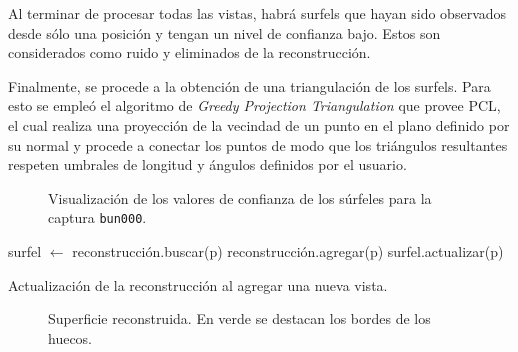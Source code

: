 	Al terminar de procesar todas las vistas, habrá surfels que hayan sido
	observados desde sólo una posición y tengan un nivel de confianza bajo.
	Estos son considerados como ruido y eliminados de la
	reconstrucción.

	Finalmente, se procede a la obtención de una triangulación de los surfels.
	Para esto se empleó el algoritmo de \emph{Greedy Projection Triangulation} que provee PCL,
	el cual realiza una proyección de la vecindad de un punto en el plano definido por su normal
	y procede a conectar los puntos de modo que los triángulos resultantes
	respeten umbrales de longitud y ángulos definidos por el usuario.

	\begin{figure}
		\caption[Visualización de los valores de confianza de los súrfeles]{\label{fig:confianza_surfel}Visualización de los valores de confianza de los súrfeles para la captura \texttt{bun000}.}
	\end{figure}


	\begin{algorithm}
		\begin{algorithmic}[1]
					\State surfel $\gets$ reconstrucción.buscar(p)
						\State reconstrucción.agregar(p)
					\Else
						\State surfel.actualizar(p)
					\EndIf
				\EndFor
			\EndFunction
		\end{algorithmic}
		\caption[Actualización de la reconstrucción al agregar una nueva vista]{\label{alg:surfel}Actualización de la reconstrucción al agregar una nueva vista.}
	\end{algorithm}

	\begin{figure}

		\caption[Superficie reconstruida]{\label{fig:surface}Superficie reconstruida. En verde se destacan los bordes de los huecos.}
	\end{figure}
